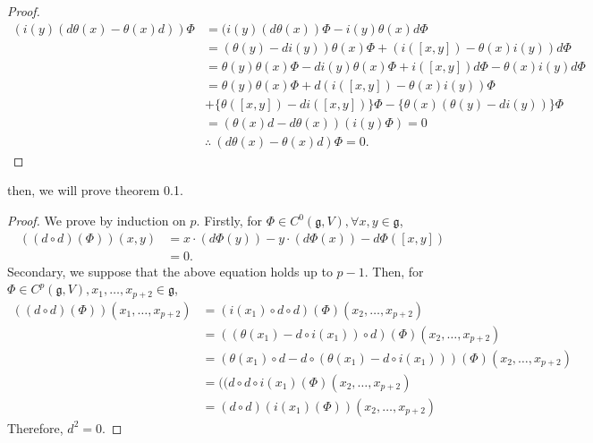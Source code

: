 \documentclass[titlepage,12pt]{article}
\newcommand{\g}{\mathfrak{g}}
\begin{document}
\begin{proof}
\begin{align*}
(i(y)(d\theta(x)-\theta(x)d))\Phi &= (i(y)(d\theta(x))\Phi -
i(y)\theta(x)d\Phi \\
&= (\theta(y)-di(y))\theta(x)\Phi +
(i([x,y])-\theta(x)i(y))d\Phi \\
&= \theta(y)\theta(x)\Phi - di(y)\theta(x)\Phi + i([x,y])d\Phi -
\theta(x)i(y)d\Phi \\
&= \theta(y)\theta(x)\Phi + d(i([x,y])-\theta(x)i(y))\Phi \\
& + \bigl\{\theta([x,y])-di([x,y])\bigr\}\Phi -
\bigl\{\theta(x)(\theta(y)-di(y))\bigr\}\Phi \\
&= (\theta(x)d-d\theta(x))(i(y)\Phi) = 0 \\
&\therefore \ (d\theta(x)-\theta(x)d)\Phi = 0.
\end{align*}
\end{proof}
then, we will prove theorem 0.1.
\begin{proof}
We prove by induction on $p$. Firstly, for $\Phi \in C^{0}(\g,V), \forall x,y \in \g$,
\begin{align*}
((d \circ d)(\Phi))(x,y) &= x \cdot (d\Phi(y))-y \cdot
(d\Phi(x)) - d\Phi([x,y]) \\
&=0.
\end{align*}
Secondary, we suppose that the above equation holds up to $p-1$. Then, for $\Phi \in C^{p}(\g,V),
x_{1},\dots,x_{p+2} \in \g$,
\begin{align*}
((d \circ d)(\Phi))(x_{1},\dots,x_{p+2}) &=(i(x_{1}) \circ d
\circ d)(\Phi)(x_{2},\dots,x_{p+2}) \\
&= ((\theta(x_{1})-d \circ i(x_{1})) \circ
d)(\Phi)(x_{2},\dots,x_{p+2}) \\
&=(\theta(x_{1}) \circ d - d \circ (\theta(x_{1}) - d \circ i
(x_{1})))(\Phi)(x_{2},\dots,x_{p+2}) \\
&=((d \circ d \circ i(x_{1})(\Phi)(x_{2},\dots,x_{p+2}) \\
&= (d \circ d)(i(x_{1})(\Phi))(x_{2},\dots,x_{p+2})
\end{align*}
Therefore, $d^{2}=0$.
\end{proof}
\end{document}
